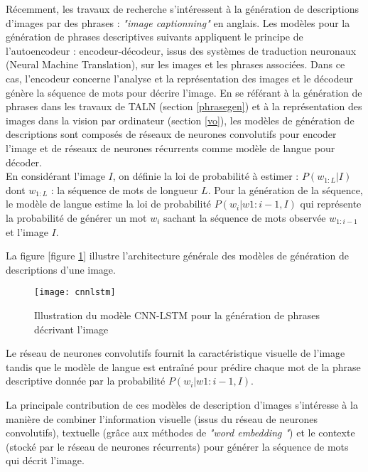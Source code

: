 \qquad Récemment, les travaux de recherche s'intéressent à la génération de descriptions d'images par des phrases : \textit{"image captionning"} en anglais. Les modèles pour la génération de phrases descriptives suivants appliquent le principe de l'autoencodeur : encodeur-décodeur, issus des systèmes de traduction neuronaux (Neural Machine Translation), sur les images et les phrases associées. Dans ce cas, l'encodeur concerne  l'analyse et la représentation des images et le décodeur  génère la séquence de mots pour décrire l'image. En se référant à la génération de phrases dans les travaux de TALN (section \ref{phrasegen}) et à la représentation des images dans la vision par ordinateur (section \ref{vo}), les modèles de génération de descriptions  sont composés de réseaux de neurones convolutifs pour encoder l'image et de réseaux de neurones récurrents comme modèle de langue pour décoder.\\
\qquad	En considérant l'image $I$, on définie la loi de probabilité à estimer :
$P(w_{1:L}| I)$ dont $w_{1:L}$ : la séquence de mots de longueur $L$.
Pour la génération de la séquence, le modèle de langue estime la loi de probabilité $P(w_i| w{1:i-1}, I)$ qui représente la probabilité de générer un mot $w_i$ sachant la séquence de mots observée $w_{1:i-1}$ et l'image $I$. 

La figure [figure \ref{cnnlstm}] illustre l'architecture générale des modèles de génération de descriptions d'une image.\\
\medskip
\begin{figure}[h]
	\begin{center}
		\texttt{[image: cnnlstm]}
		\caption{Illustration du modèle CNN-LSTM pour la génération de phrases décrivant l'image \cite{donahue2015long} \label{cnnlstm}}
	\end{center}
\end{figure}

Le réseau de neurones convolutifs fournit la caractéristique visuelle de l'image tandis que le modèle de langue est entraîné pour prédire chaque mot de la phrase descriptive donnée par la probabilité $P(w_i| w{1:i-1}, I)$.

\qquad	La principale contribution de ces modèles de description d'images s'intéresse à la manière de combiner l'information visuelle (issus du réseau de neurones convolutifs), textuelle (grâce aux méthodes de \textit{"word embedding "}) et le contexte (stocké par le réseau de neurones récurrents) pour générer la séquence de mots qui décrit l'image.

